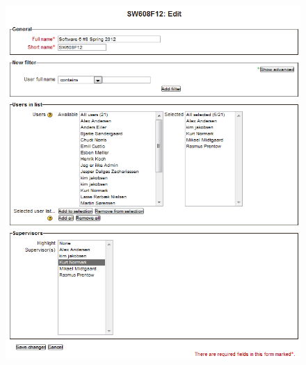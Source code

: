 \begin{figure}
	\centering
		\includegraphics[width=\textwidth]{images/moodleprojecgroupedit.png}
	\label{fig:moodleprojecgroupedit}
\end{figure}
\FloatBarrier
